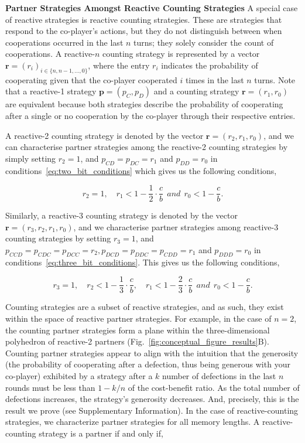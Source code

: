 \documentclass[11pt]{article}
\begin{document}
\textbf{Partner Strategies Amongst Reactive Counting Strategies}
A special case of reactive strategies is reactive counting strategies. These are
strategies that respond to the co-player's actions, but they do not distinguish
between when cooperations occurred in the last $n$ turns; they solely consider
the count of cooperations. A reactive-$n$ counting strategy is represented by a
vector $\mathbf{r}=(r_i)_{i \in \{n, n -1, \dots, 0\}}$, where the entry \(r_i\)
indicates the probability of cooperating given that the co-player cooperated
\(i\) times in the last \(n\) turns. Note that a reactive-1 strategy
$\mathbf{p}=(p_{C}, p_{D})$ and a counting strategy $\mathbf{r}=(r_1, r_0)$ are
equivalent because both strategies describe the probability of cooperating after
a single or no cooperation by the co-player through their respective entries. 

A reactive-2 counting strategy is denoted by the vector $\mathbf{r}=(r_2,
r_1, r_0)$, and we can characterise partner strategies among the reactive-2
counting strategies by simply setting $r_2 = 1$, and $p_{CD} = p_{DC} = r_1$ and
$p_{DD} = r_0$ in conditions~\eqref{eq:two_bit_conditions} which gives us the
following conditions,

\begin{equation}\label{eq:counting_two_bit_conditions}
  r_2 = 1, \quad \displaystyle r_1 < 1-\frac{1}{2} \cdot \frac{c}{b} ~~and~~ r_0 < 1\!-\! \frac{c}{b}.
\end{equation}

Similarly, a reactive-3 counting strategy is denoted by the vector
$\mathbf{r}=(r_3, r_2, r_1, r_0)$, and we characterise partner strategies among
reactive-3 counting strategies by setting $r_3 = 1$, and $p_{CCD} = p_{CDC} =
p_{DCC} = r_2, p_{DCD} = p_{DDC} = p_{CDD} = r_1$ and $p_{DDD} = r_0$ in
conditions~\eqref{eq:three_bit_conditions}. This gives us the following
conditions,

\begin{equation}\label{eq:counting_three_bit_conditions}
  r_3 = 1, \quad \displaystyle r_2 < 1- \frac{1}{3} \cdot \frac{c}{b}, \quad r_1 < 1- \frac{2}{3} \cdot \frac{c}{b} ~~and~~ r_0 < 1\!-\! \frac{c}{b}.
\end{equation}

Counting strategies are a subset of reactive strategies, and as such, they exist
within the space of reactive partner strategies. For example, in the case of
$n=2$, the counting partner strategies form a plane within the three-dimensional
polyhedron of reactive-2 partners (Fig.~\ref{fig:conceptual_figure_results}B).
Counting partner strategies appear to align with the intuition that the
generosity (the probability of cooperating after a defection, thus being
generous with your co-player) exhibited by a strategy after a $k$ number of
defections in the last $n$ rounds must be less than $1 - k/n$ of the
cost-benefit ratio. As the total number of defections increases, the strategy's
generosity decreases. And, precisely, this is the result we prove (see
Supplementary Information). In the case of reactive-counting strategies, we
characterize partner strategies for all memory lengths. A reactive-counting
strategy is a partner if and only if,
\end{document}
